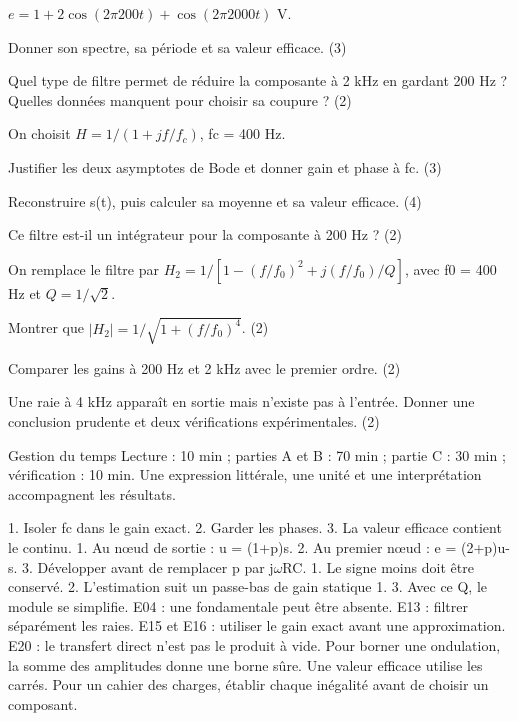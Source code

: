 $e=1+2\cos(2\pi200t)+\cos(2\pi2000t)$ V.\begin{questions}
\item Donner son spectre, sa période et sa valeur efficace. (3)
\item Quel type de filtre permet de réduire la composante à 2 kHz en gardant 200 Hz ? Quelles données manquent pour choisir sa coupure ? (2)
\end{questions}

On choisit $H=1/(1+jf/f_c)$, fc = 400 Hz.\begin{questions}
\item Justifier les deux asymptotes de Bode et donner gain et phase à fc. (3)
\item Reconstruire s(t), puis calculer sa moyenne et sa valeur efficace. (4)
\item Ce filtre est-il un intégrateur pour la composante à 200 Hz ? (2)
\end{questions}



On remplace le filtre par $H_2=1/[1-(f/f_0)^2+j(f/f_0)/Q]$, avec f0 = 400 Hz et $Q=1/\sqrt2$.\begin{questions}
\item Montrer que $|H_2|=1/\sqrt{1+(f/f_0)^4}$. (2)
\item Comparer les gains à 200 Hz et 2 kHz avec le premier ordre. (2)
\item Une raie à 4 kHz apparaît en sortie mais n’existe pas à l’entrée. Donner une conclusion prudente et deux vérifications expérimentales. (2)
\end{questions}

\begin{docu}{Gestion du temps}
Lecture : 10 min ; parties A et B : 70 min ; partie C : 30 min ; vérification : 10 min. Une expression littérale, une unité et une interprétation accompagnent les résultats.
\end{docu}


1. Isoler fc dans le gain exact. 2. Garder les phases. 3. La valeur efficace contient le continu.
1. Au nœud de sortie : u = (1+p)s. 2. Au premier nœud : e = (2+p)u-s. 3. Développer avant de remplacer p par j\ensuremath{\omega}RC.
1. Le signe moins doit être conservé. 2. L’estimation suit un passe-bas de gain statique 1. 3. Avec ce Q, le module se simplifie.
E04 : une fondamentale peut être absente. E13 : filtrer séparément les raies. E15 et E16 : utiliser le gain exact avant une approximation. E20 : le transfert direct n’est pas le produit à vide.
Pour borner une ondulation, la somme des amplitudes donne une borne sûre. Une valeur efficace utilise les carrés. Pour un cahier des charges, établir chaque inégalité avant de choisir un composant.


